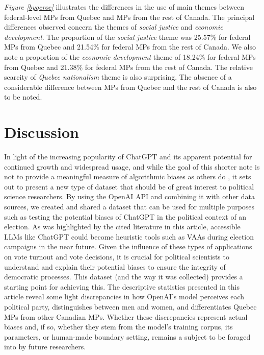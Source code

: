 \documentclass{article}
\begin{document}
\textit{Figure \ref{byqcroc}} illustrates the differences in the use of main themes between federal-level MPs from Quebec and MPs from the rest of Canada. The principal differences observed concern the themes of \textit{social justice} and \textit{economic development}. The proportion of the \textit{social justice} theme was 25.57\% for federal MPs from Quebec and 21.54\% for federal MPs from the rest of Canada. We also note a proportion of the \textit{economic development} theme of 18.24\% for federal MPs from Quebec and 21.38\% for federal MPs from the rest of Canada. The relative scarcity of \textit{Quebec nationalism} theme is also surprising. The absence of a considerable difference between MPs from Quebec and the rest of Canada is also to be noted.



\section{Discussion}
In light of the increasing popularity of ChatGPT and its apparent potential for continued growth and widespread usage, and while the goal of this shorter note is not to provide a meaningful measure of algorithmic biases as others do \parencite{hartmann_etal23, santurkar_etal23, rutinowski_etal23, kim_lee23}, it sets out to present a new type of dataset that should be of great interest to political science researchers. By using the OpenAI API and combining it with other data sources, we created and shared a dataset that can be used for multiple purposes such as testing the potential biases of ChatGPT in the political context of an election. As was highlighted by the cited literature in this article, accessible LLMs like ChatGPT could become heuristic tools such as VAAs during election campaigns in the near future. Given the influence of these types of applications on vote turnout and vote decisions, it is crucial for political scientists to understand and explain their potential biases to ensure the integrity of democratic processes. This dataset (and the way it was collected) provides a starting point for achieving this.
The descriptive statistics presented in this article reveal some light discrepancies in how OpenAI's model perceives each political party, distinguishes between men and women, and differentiates Quebec MPs from other Canadian MPs. Whether these discrepancies represent actual biases and, if so, whether they stem from the model's training corpus, its parameters, or human-made boundary setting, remains a subject to be foraged into by future researchers.\\
\end{document}
